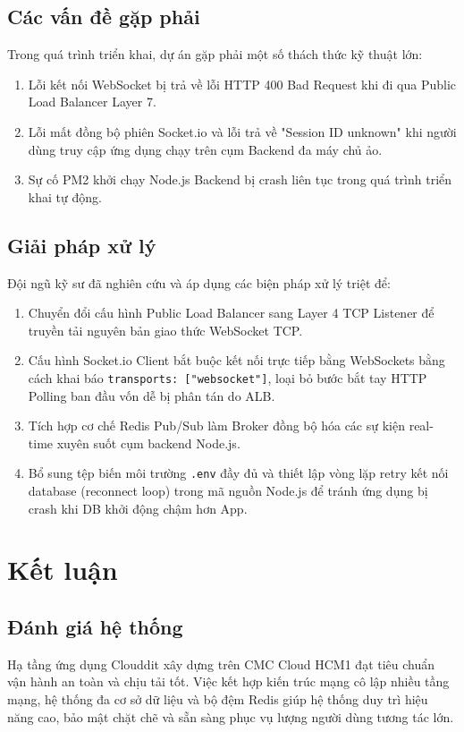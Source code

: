\documentclass[12pt, a4paper]{article}
\begin{document}
\subsection{Các vấn đề gặp phải}
Trong quá trình triển khai, dự án gặp phải một số thách thức kỹ thuật lớn:
\begin{enumerate}
    \item Lỗi kết nối WebSocket bị trả về lỗi HTTP 400 Bad Request khi đi qua Public Load Balancer Layer 7.
    \item Lỗi mất đồng bộ phiên Socket.io và lỗi trả về "Session ID unknown" khi người dùng truy cập ứng dụng chạy trên cụm Backend đa máy chủ ảo.
    \item Sự cố PM2 khởi chạy Node.js Backend bị crash liên tục trong quá trình triển khai tự động.
\end{enumerate}

\subsection{Giải pháp xử lý}
Đội ngũ kỹ sư đã nghiên cứu và áp dụng các biện pháp xử lý triệt để:
\begin{enumerate}
    \item Chuyển đổi cấu hình Public Load Balancer sang Layer 4 TCP Listener để truyền tải nguyên bản giao thức WebSocket TCP.
    \item Cấu hình Socket.io Client bắt buộc kết nối trực tiếp bằng WebSockets bằng cách khai báo \texttt{transports: ["websocket"]}, loại bỏ bước bắt tay HTTP Polling ban đầu vốn dễ bị phân tán do ALB.
    \item Tích hợp cơ chế Redis Pub/Sub làm Broker đồng bộ hóa các sự kiện real-time xuyên suốt cụm backend Node.js.
    \item Bổ sung tệp biến môi trường \texttt{.env} đầy đủ và thiết lập vòng lặp retry kết nối database (reconnect loop) trong mã nguồn Node.js để tránh ứng dụng bị crash khi DB khởi động chậm hơn App.
\end{enumerate}



\section{Kết luận}

\subsection{Đánh giá hệ thống}
Hạ tầng ứng dụng Clouddit xây dựng trên CMC Cloud HCM1 đạt tiêu chuẩn vận hành an toàn và chịu tải tốt. Việc kết hợp kiến trúc mạng cô lập nhiều tầng mạng, hệ thống đa cơ sở dữ liệu và bộ đệm Redis giúp hệ thống duy trì hiệu năng cao, bảo mật chặt chẽ và sẵn sàng phục vụ lượng người dùng tương tác lớn.
\end{document}
